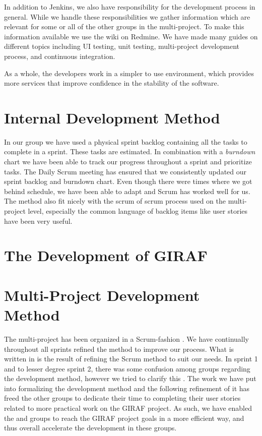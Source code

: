 In addition to Jenkins, we also have responsibility for the development process in general. While we handle these responsibilities we gather information which are relevant for some or all of the other groups in the multi-project. To make this information available we use the wiki on Redmine. We have made many guides on different topics including UI testing, unit testing, multi-project development process, and continuous integration.

As a whole, the developers work in a simpler to use environment, which provides more services that improve confidence in the stability of the software.

\section{Internal Development Method}\label{conc:internalprocess}
In our group we have used a physical sprint backlog containing all the tasks to complete in a sprint. These tasks are estimated. In combination with a \emph{burndown} chart we have been able to track our progress throughout a sprint and prioritize tasks. The Daily Scrum meeting has ensured that we consistently updated our sprint backlog and burndown chart. Even though there were times where we got behind schedule, we have been able to adapt and Scrum has worked well for us. The method also fit nicely with the scrum of scrum process used on the multi-project level, especially the common language of backlog items like user stories have been very useful.

\section{The Development of GIRAF}\label{conc:multi_project_eval}


\section{Multi-Project Development Method}\label{conc:multi_project_process_eval}
The multi-project has been organized in a Scrum-fashion . We have continually throughout all sprints refined the method to improve our process. What is written in  is the result of refining the Scrum method to suit our needs. In sprint 1 and to lesser degree sprint 2, there was some confusion among groups regarding the development method, however we tried to clarify this . The work we have put into formalizing the development method and the following refinement of it has freed the other groups to dedicate their time to completing their user stories related to more practical work on the GIRAF project. As such, we have enabled the \gui and \db groups to reach the GIRAF project goals in a more efficient way, and thus overall accelerate the development in these groups.

